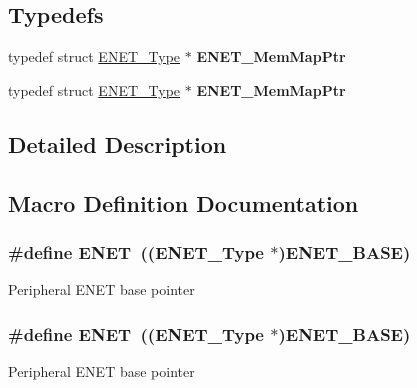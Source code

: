 \subsection*{Typedefs}
\begin{DoxyCompactItemize}
\item 
typedef struct \hyperlink{structENET__Type}{E\+N\+E\+T\+\_\+\+Type} $\ast$ {\bfseries E\+N\+E\+T\+\_\+\+Mem\+Map\+Ptr}\hypertarget{group__ENET__Peripheral__Access__Layer_ga4f1bbb999588075357d354eb9893f9f2}{}\label{group__ENET__Peripheral__Access__Layer_ga4f1bbb999588075357d354eb9893f9f2}

\item 
typedef struct \hyperlink{structENET__Type}{E\+N\+E\+T\+\_\+\+Type} $\ast$ {\bfseries E\+N\+E\+T\+\_\+\+Mem\+Map\+Ptr}\hypertarget{group__ENET__Peripheral__Access__Layer_ga4f1bbb999588075357d354eb9893f9f2}{}\label{group__ENET__Peripheral__Access__Layer_ga4f1bbb999588075357d354eb9893f9f2}

\end{DoxyCompactItemize}


\subsection{Detailed Description}


\subsection{Macro Definition Documentation}
\subsubsection[{\texorpdfstring{E\+N\+ET}{ENET}}]{\setlength{\rightskip}{0pt plus 5cm}\#define E\+N\+ET~(({\bf E\+N\+E\+T\+\_\+\+Type} $\ast$){\bf E\+N\+E\+T\+\_\+\+B\+A\+SE})}\hypertarget{group__ENET__Peripheral__Access__Layer_ga4745105f505f3ab949d6a57fbe2a0ed5}{}\label{group__ENET__Peripheral__Access__Layer_ga4745105f505f3ab949d6a57fbe2a0ed5}
Peripheral E\+N\+ET base pointer 
\subsubsection[{\texorpdfstring{E\+N\+ET}{ENET}}]{\setlength{\rightskip}{0pt plus 5cm}\#define E\+N\+ET~(({\bf E\+N\+E\+T\+\_\+\+Type} $\ast$){\bf E\+N\+E\+T\+\_\+\+B\+A\+SE})}\hypertarget{group__ENET__Peripheral__Access__Layer_ga4745105f505f3ab949d6a57fbe2a0ed5}{}\label{group__ENET__Peripheral__Access__Layer_ga4745105f505f3ab949d6a57fbe2a0ed5}
Peripheral E\+N\+ET base pointer 
